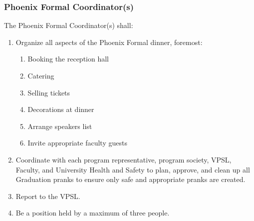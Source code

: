 
\subsubsection{Phoenix Formal Coordinator(s)}
\label{phoenix-formal-coordinators}
The Phoenix Formal Coordinator(s) shall:

\begin{enumerate}
 \item
  Organize all aspects of the Phoenix Formal dinner, foremost:

  \begin{enumerate}
   \item
    Booking the reception hall
   \item
    Catering
   \item
    Selling tickets
   \item
    Decorations at dinner
   \item
    Arrange speakers list
   \item
    Invite appropriate faculty guests
  \end{enumerate}
 \item
  Coordinate with each program representative, program society, VPSL, Faculty, and University Health and Safety to plan, approve, and clean up all Graduation pranks to ensure only safe and appropriate pranks are created.
 \item
  Report to the VPSL.
 \item
  Be a position held by a maximum of three people.

\end{enumerate}